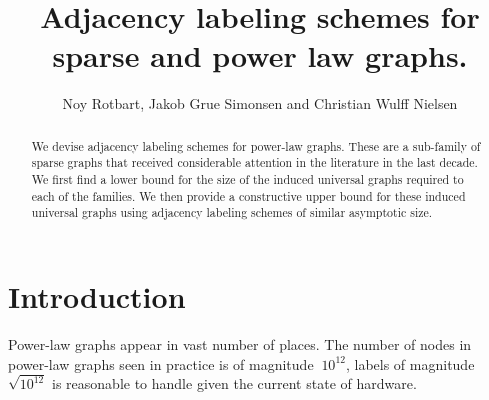 \documentclass{article}
\title{Adjacency labeling  schemes for sparse and power law graphs.}
\author{Noy Rotbart, Jakob Grue Simonsen and Christian Wulff Nielsen}
\theoremstyle{remark}
\begin{document}
\maketitle
\begin{abstract}
We devise adjacency labeling schemes for power-law graphs. These are a sub-family of sparse graphs that  received considerable attention in the literature in the last decade. We first find a lower bound for the size of the induced universal graphs required to each of the families.
We then  provide a constructive upper bound for these induced universal graphs using adjacency  labeling schemes of similar asymptotic size.
\end{abstract}
\section{Introduction}
Power-law graphs appear in vast number of places.
The number of nodes in power-law graphs seen in practice is of magnitude $~10^{12}$, labels of magnitude $\sqrt{10^{12}}$ is reasonable to handle given the current state of hardware. 
\end{document}
